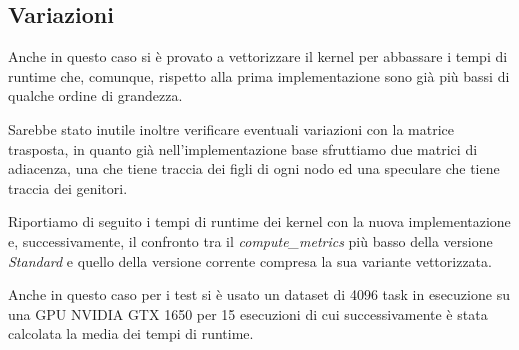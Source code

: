\documentclass[../relazione.tex]{subfiles}
\begin{document}
\subsection{Variazioni}
Anche in questo caso si è provato a vettorizzare il kernel per abbassare i tempi di runtime che, comunque, rispetto alla prima implementazione sono già più bassi di qualche ordine di grandezza.

Sarebbe stato inutile inoltre verificare eventuali variazioni con la matrice trasposta, in quanto già nell'implementazione base sfruttiamo due matrici di adiacenza, una che tiene traccia dei figli di ogni nodo ed una speculare che tiene traccia dei genitori.

Riportiamo di seguito i tempi di runtime dei kernel con la nuova implementazione e, successivamente, il confronto tra il \textit{compute\_metrics} più basso della versione \textit{Standard} e quello della versione corrente compresa la sua variante vettorizzata.

Anche in questo caso per i test si è usato un dataset di 4096 task in esecuzione su una GPU NVIDIA GTX 1650 per 15 esecuzioni di cui successivamente è stata calcolata la media dei tempi di runtime.
\end{document}
